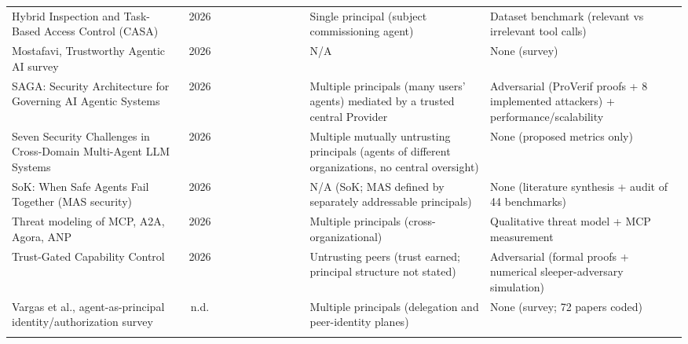 \documentclass[conference]{IEEEtran}
\newcommand{\full}{{\small\CIRCLE}}
\newcommand{\half}{{\small\LEFTcircle}}
\newcommand{\none}{{\small\Circle}}
\begin{document}
{\begin{longtable}{>{\raggedright\arraybackslash}p{4.2cm} c cccccccc >{\raggedright\arraybackslash}p{3.6cm} >{\raggedright\arraybackslash}p{4.4cm}}
Hybrid Inspection and Task-Based Access Control (CASA) \cite{elhelou2026hybrid} & 2026 & \none{} & \none{} & \none{} & \half{} & \none{} & \none{} & \none{} & \half{} & Single principal (subject commissioning agent) & Dataset benchmark (relevant vs irrelevant tool calls) \\
Mostafavi, Trustworthy Agentic AI survey \cite{mostafavi2026trustworthy} & 2026 & \none{} & \none{} & \none{} & \half{} & \none{} & \none{} & \half{} & \half{} & N/A & None (survey) \\
SAGA: Security Architecture for Governing AI Agentic Systems \cite{syros2026saga} & 2026 & \half{} & \half{} & \none{} & \half{} & \none{} & \half{} & \none{} & \full{} & Multiple principals (many users' agents) mediated by a trusted central Provider & Adversarial (ProVerif proofs + 8 implemented attackers) + performance/scalability \\
Seven Security Challenges in Cross-Domain Multi-Agent LLM Systems \cite{ko2026sevenchallenges} & 2026 & \half{} & \half{} & \none{} & \none{} & \half{} & \half{} & \half{} & \half{} & Multiple mutually untrusting principals (agents of different organizations, no central oversight) & None (proposed metrics only) \\
SoK: When Safe Agents Fail Together (MAS security) \cite{yang2026soksafeagents} & 2026 & \half{} & \half{} & \none{} & \half{} & \half{} & \none{} & \half{} & \half{} & N/A (SoK; MAS defined by separately addressable principals) & None (literature synthesis + audit of 44 benchmarks) \\
Threat modeling of MCP, A2A, Agora, ANP \cite{anbiaee2026threat} & 2026 & \none{} & \half{} & \none{} & \none{} & \none{} & \none{} & \none{} & \half{} & Multiple principals (cross-organizational) & Qualitative threat model + MCP measurement \\
Trust-Gated Capability Control \cite{nipu2026trustgated} & 2026 & \none{} & \none{} & \none{} & \half{} & \none{} & \none{} & \none{} & \full{} & Untrusting peers (trust earned; principal structure not stated) & Adversarial (formal proofs + numerical sleeper-adversary simulation) \\
Vargas et al., agent-as-principal identity/authorization survey \cite{vargas_identity} & n.d. & \none{} & \half{} & \none{} & \half{} & \none{} & \none{} & \none{} & \half{} & Multiple principals (delegation and peer-identity planes) & None (survey; 72 papers coded) \\
\multicolumn{12}{l}{\textit{Governance/CoopAI}} \\

\end{longtable}}
\end{document}
